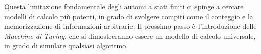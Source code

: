 \documentclass[a4paper]{article}
\theoremstyle{definition} %
\begin{document}
Questa limitazione fondamentale degli automi a stati finiti ci spinge a cercare modelli di calcolo più potenti, in grado di svolgere compiti come il conteggio e la memorizzazione di informazioni arbitrarie. Il prossimo passo è l'introduzione delle \emph{Macchine di Turing}, che si dimostreranno essere un modello di calcolo universale, in grado di simulare qualsiasi algoritmo.
\end{document}
